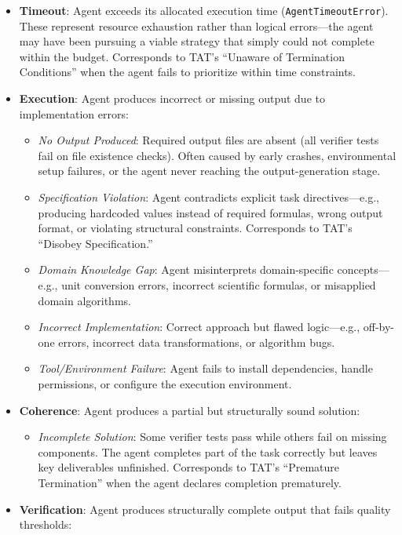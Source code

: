 \begin{itemize}[nosep]
\item \textbf{Timeout}: Agent exceeds its allocated execution time (\texttt{AgentTimeoutError}). These represent resource exhaustion rather than logical errors---the agent may have been pursuing a viable strategy that simply could not complete within the budget. Corresponds to TAT's ``Unaware of Termination Conditions'' when the agent fails to prioritize within time constraints.
\item \textbf{Execution}: Agent produces incorrect or missing output due to implementation errors:
  \begin{itemize}[nosep]
  \item \emph{No Output Produced}: Required output files are absent (all verifier tests fail on file existence checks). Often caused by early crashes, environmental setup failures, or the agent never reaching the output-generation stage.
  \item \emph{Specification Violation}: Agent contradicts explicit task directives---e.g., producing hardcoded values instead of required formulas, wrong output format, or violating structural constraints. Corresponds to TAT's ``Disobey Specification.''
  \item \emph{Domain Knowledge Gap}: Agent misinterprets domain-specific concepts---e.g., unit conversion errors, incorrect scientific formulas, or misapplied domain algorithms.
  \item \emph{Incorrect Implementation}: Correct approach but flawed logic---e.g., off-by-one errors, incorrect data transformations, or algorithm bugs.
  \item \emph{Tool/Environment Failure}: Agent fails to install dependencies, handle permissions, or configure the execution environment.
  \end{itemize}
\item \textbf{Coherence}: Agent produces a partial but structurally sound solution:
  \begin{itemize}[nosep]
  \item \emph{Incomplete Solution}: Some verifier tests pass while others fail on missing components. The agent completes part of the task correctly but leaves key deliverables unfinished. Corresponds to TAT's ``Premature Termination'' when the agent declares completion prematurely.
  \end{itemize}
\item \textbf{Verification}: Agent produces structurally complete output that fails quality thresholds:

\end{itemize}
